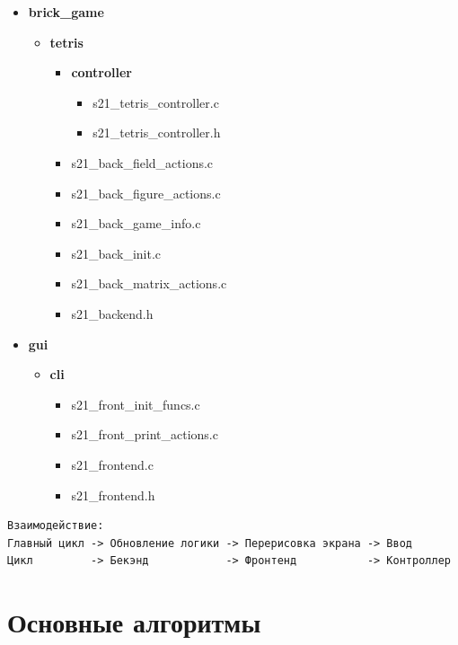 \documentclass[a4paper, 12pt]{report}
\begin{document}
\begin{itemize}
    \item \textbf{brick\_game}
    \begin{itemize}
        \item \textbf{tetris}
        \begin{itemize}
            \item \textbf{controller}
            \begin{itemize}
                \item s21\_tetris\_controller.c
                \item s21\_tetris\_controller.h
            \end{itemize}
            \item s21\_back\_field\_actions.c
            \item s21\_back\_figure\_actions.c
            \item s21\_back\_game\_info.c
            \item s21\_back\_init.c
            \item s21\_back\_matrix\_actions.c
            \item s21\_backend.h
        \end{itemize}
    \end{itemize}
    
    \item \textbf{gui}
    \begin{itemize}
        \item \textbf{cli}
        \begin{itemize}
            \item s21\_front\_init\_funcs.c
            \item s21\_front\_print\_actions.c
            \item s21\_frontend.c
            \item s21\_frontend.h
        \end{itemize}
    \end{itemize}
\end{itemize}

\begin{verbatim}
Взаимодействие:
Главный цикл -> Обновление логики -> Перерисовка экрана -> Ввод
Цикл         -> Бекэнд            -> Фронтенд           -> Контроллер
\end{verbatim}

\clearpage
\chapter{Основные алгоритмы}
\end{document}
